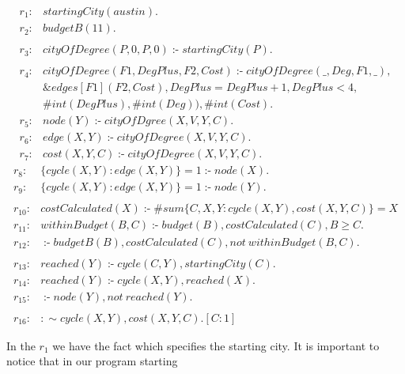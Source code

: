 \documentclass[a4paper, titlepage]{article}
\newcommand{\ext}[3]{\ensuremath{\&{#1}[#2](#3)}}
\DeclareMathOperator{\leftimpl}{:-}
\begin{document}
\begin{exmp}
\label{travellingSalesman}
\begin{align*}
r_1\colon & startingCity(austin).\\
r_2\colon & budgetB(11).\\
\\
r_3\colon & \mathit{cityOfDegree(P,0,P,0)} \leftimpl 
\mathit{startingCity(P).} \\
& \\
r_4\colon & \mathit{cityOfDegree(F1, DegPlus, F2, Cost)} 
\leftimpl \mathit{cityOfDegree(\_, Deg, F1, \_)}, \\ 
&\ext{edges}{F1}{F2, Cost}, \mathit{DegPlus=DegPlus+1}, 
DegPlus < 4, \\ & \#int(DegPlus), \#int(Deg)), \#int(Cost). 
\\
r_5\colon& \mathit{node(Y)} \leftimpl 
\mathit{cityOfDgree(X, V, Y, C)}.\\
r_6\colon& \mathit{edge}(X, Y) \leftimpl 
\mathit{cityOfDegree(X, V, Y, C).} \\
r_7\colon & cost(X,Y,C) \leftimpl cityOfDegree(X, V, Y, C). 
\end{align*}
\begin{align*}
r_8 \colon & \{ cycle(X,Y) : edge(X,Y) \} = 1 \leftimpl 
node(X). \\
r_{9} \colon &  \{ cycle(X,Y) : edge(X,Y) \} = 1 \leftimpl 
node(Y). \\
& \\
r_{10} \colon & costCalculated(X) \leftimpl \#sum \{C,X,Y : 
cycle(X,Y), cost(X,Y,C)\} = X \\
r_{11} \colon & withinBudget(B,C) \leftimpl budget(B), 
costCalculated(C), B \geq C. \\
r_{12} \colon & \leftimpl  budgetB(B), costCalculated(C), 
\mathit{not} \ \mathit{withinBudget(B,C).} \\
& \\
r_{13} \colon & reached(Y) \leftimpl cycle(C, Y), startingCity(C). \\
r_{14} \colon & reached(Y) \leftimpl cycle(X,Y), 
reached(X). \\
r_{15} \colon & \leftimpl node(Y), \mathit{not} \ 
\mathit{reached(Y)}. \\
& \\
r_{16} \colon & :\sim cycle(X,Y), cost(X,Y,C). [C:1] 
\end{align*}
\end{exmp}
In the $r_1$ we have the fact which specifies the starting 
city. 
It is important to notice that in our program starting 
\end{document}
